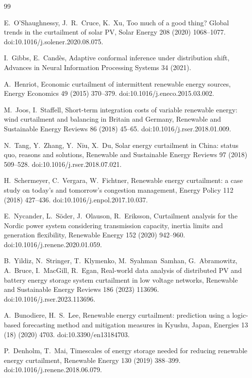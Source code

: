 \begin{thebibliography}{99}

E.~O'Shaughnessy, J.~R.~Cruce, K.~Xu,
Too much of a good thing? Global trends in the curtailment of solar PV,
Solar Energy 208 (2020) 1068--1077.
doi:10.1016/j.solener.2020.08.075.

I.~Gibbs, E.~Cand\`es,
Adaptive conformal inference under distribution shift,
Advances in Neural Information Processing Systems 34 (2021).

A.~Henriot,
Economic curtailment of intermittent renewable energy sources,
Energy Economics 49 (2015) 370--379.
doi:10.1016/j.eneco.2015.03.002.

M.~Joos, I.~Staffell,
Short-term integration costs of variable renewable energy: wind curtailment and balancing in Britain and Germany,
Renewable and Sustainable Energy Reviews 86 (2018) 45--65.
doi:10.1016/j.rser.2018.01.009.

N.~Tang, Y.~Zhang, Y.~Niu, X.~Du,
Solar energy curtailment in China: status quo, reasons and solutions,
Renewable and Sustainable Energy Reviews 97 (2018) 509--528.
doi:10.1016/j.rser.2018.07.021.

H.~Schermeyer, C.~Vergara, W.~Fichtner,
Renewable energy curtailment: a case study on today's and tomorrow's congestion management,
Energy Policy 112 (2018) 427--436.
doi:10.1016/j.enpol.2017.10.037.

E.~Nycander, L.~S\"oder, J.~Olauson, R.~Eriksson,
Curtailment analysis for the Nordic power system considering transmission capacity, inertia limits and generation flexibility,
Renewable Energy 152 (2020) 942--960.
doi:10.1016/j.renene.2020.01.059.

B.~Yildiz, N.~Stringer, T.~Klymenko, M.~Syahman~Samhan, G.~Abramowitz, A.~Bruce, I.~MacGill, R.~Egan,
Real-world data analysis of distributed PV and battery energy storage system curtailment in low voltage networks,
Renewable and Sustainable Energy Reviews 186 (2023) 113696.
doi:10.1016/j.rser.2023.113696.

A.~Bunodiere, H.~S.~Lee,
Renewable energy curtailment: prediction using a logic-based forecasting method and mitigation measures in Kyushu, Japan,
Energies 13 (18) (2020) 4703.
doi:10.3390/en13184703.

P.~Denholm, T.~Mai,
Timescales of energy storage needed for reducing renewable energy curtailment,
Renewable Energy 130 (2019) 388--399.
doi:10.1016/j.renene.2018.06.079.


\end{thebibliography}
